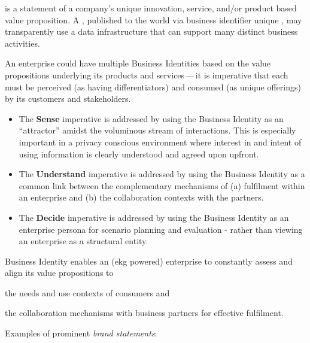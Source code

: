  is a statement of a company's unique innovation, service, and/or product based
value proposition.
A , published to the world via business identifier unique ,
may transparently use a data infrastructure that can support many distinct business activities.

An enterprise could have multiple Business Identities based on the value propositions underlying its
products and services\,---\,it is imperative that each must be perceived (as having differentiators) and
consumed (as unique offerings) by its customers and stakeholders.

\begin{itemize}
    \item The \textbf{Sense} imperative is addressed by using the Business Identity
          as an “attractor” amidst the voluminous stream of interactions.
          This is especially important in a privacy conscious environment where interest in and intent of using
          information is clearly understood and agreed upon upfront.
    \item The \textbf{Understand} imperative is addressed by using the Business Identity as a common link between the
          complementary mechanisms of (a) fulfilment within an enterprise and (b) the collaboration contexts with
          the partners.
    \item The \textbf{Decide} imperative is addressed by using the Business Identity as an enterprise persona for scenario
          planning and evaluation - rather than viewing an enterprise as a structural entity.
\end{itemize}

Business Identity enables an (\gls{ekg} powered) enterprise to constantly
assess and align its value propositions to
\begin{enumerate*}[(a)]
    \item the needs and use contexts of consumers and
    \item the collaboration mechanisms with business partners for effective fulfilment.
\end{enumerate*}

Examples of prominent \textit{brand statements}:

